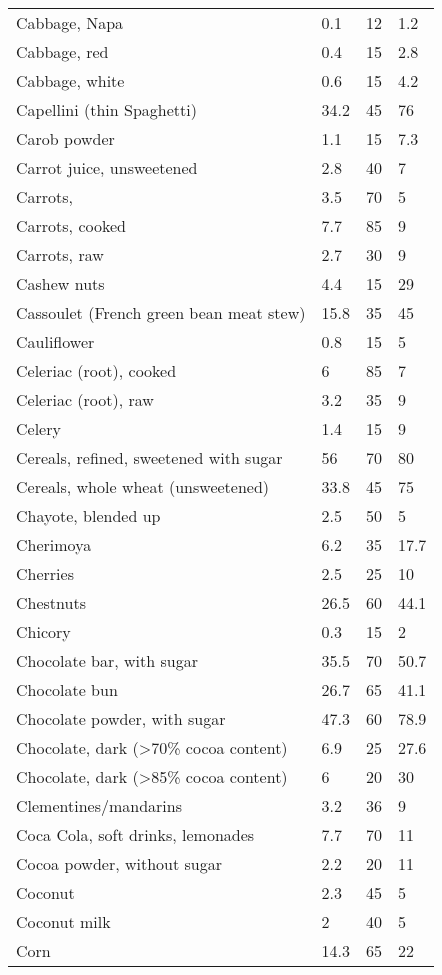\documentclass[../main.tex]{subfiles}
\begin{document}
\begin{longtable}{llll}
Cabbage, Napa & 0.1 & 12 & 1.2 \\
Cabbage, red & 0.4 & 15 & 2.8 \\
Cabbage, white & 0.6 & 15 & 4.2 \\
Capellini (thin Spaghetti) & 34.2 & 45 & 76 \\
Carob powder & 1.1 & 15 & 7.3 \\
Carrot juice, unsweetened & 2.8 & 40 & 7 \\
Carrots,  & 3.5 & 70 & 5 \\
Carrots, cooked & 7.7 & 85 & 9 \\
Carrots, raw & 2.7 & 30 & 9 \\
Cashew nuts & 4.4 & 15 & 29 \\
Cassoulet (French green bean meat stew) & 15.8 & 35 & 45 \\
Cauliflower & 0.8 & 15 & 5 \\
Celeriac (root), cooked & 6 & 85 & 7 \\
Celeriac (root), raw & 3.2 & 35 & 9 \\
Celery & 1.4 & 15 & 9 \\
Cereals, refined, sweetened with sugar & 56 & 70 & 80 \\
Cereals, whole wheat (unsweetened) & 33.8 & 45 & 75 \\
Chayote, blended up & 2.5 & 50 & 5 \\
Cherimoya & 6.2 & 35 & 17.7 \\
Cherries & 2.5 & 25 & 10 \\
Chestnuts & 26.5 & 60 & 44.1 \\
Chicory & 0.3 & 15 & 2 \\
Chocolate bar, with sugar & 35.5 & 70 & 50.7 \\
Chocolate bun & 26.7 & 65 & 41.1 \\
Chocolate powder, with sugar & 47.3 & 60 & 78.9 \\
Chocolate, dark (\textgreater 70\% cocoa content) & 6.9 & 25 & 27.6 \\
Chocolate, dark (\textgreater 85\% cocoa content) & 6 & 20 & 30 \\
Clementines/mandarins & 3.2 & 36 & 9 \\
Coca Cola, soft drinks, lemonades & 7.7 & 70 & 11 \\
Cocoa powder, without sugar & 2.2 & 20 & 11 \\
Coconut   & 2.3 & 45 & 5 \\
Coconut milk & 2 & 40 & 5 \\
Corn & 14.3 & 65 & 22 \\

\end{longtable}
\end{document}
